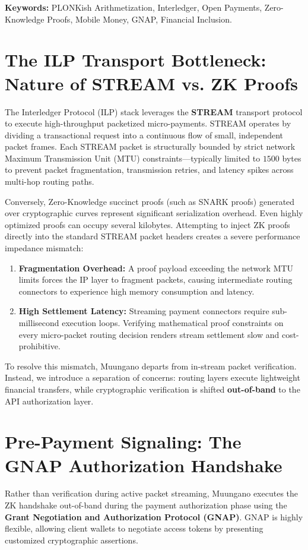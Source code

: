 \documentclass[12pt]{article}
\begin{document}
\textbf{Keywords:} PLONKish Arithmetization, Interledger, Open Payments, Zero-Knowledge Proofs, Mobile Money, GNAP, Financial Inclusion.

\newpage

\section{The ILP Transport Bottleneck: Nature of STREAM vs. ZK Proofs}
The Interledger Protocol (ILP) stack leverages the \textbf{STREAM} transport protocol to execute high-throughput packetized micro-payments. STREAM operates by dividing a transactional request into a continuous flow of small, independent packet frames. Each STREAM packet is structurally bounded by strict network Maximum Transmission Unit (MTU) constraints---typically limited to $1500$ bytes to prevent packet fragmentation, transmission retries, and latency spikes across multi-hop routing paths.

Conversely, Zero-Knowledge succinct proofs (such as SNARK proofs) generated over cryptographic curves represent significant serialization overhead. Even highly optimized proofs can occupy several kilobytes. Attempting to inject ZK proofs directly into the standard STREAM packet headers creates a severe performance impedance mismatch:
\begin{enumerate}
    \item \textbf{Fragmentation Overhead:} A proof payload exceeding the network MTU limits forces the IP layer to fragment packets, causing intermediate routing connectors to experience high memory consumption and latency.
    \item \textbf{High Settlement Latency:} Streaming payment connectors require sub-millisecond execution loops. Verifying mathematical proof constraints on every micro-packet routing decision renders stream settlement slow and cost-prohibitive.
\end{enumerate}

To resolve this mismatch, Muungano departs from in-stream packet verification. Instead, we introduce a separation of concerns: routing layers execute lightweight financial transfers, while cryptographic verification is shifted \textbf{out-of-band} to the API authorization layer.

\section{Pre-Payment Signaling: The GNAP Authorization Handshake}
Rather than verification during active packet streaming, Muungano executes the ZK handshake out-of-band during the payment authorization phase using the \textbf{Grant Negotiation and Authorization Protocol (GNAP)}. GNAP is highly flexible, allowing client wallets to negotiate access tokens by presenting customized cryptographic assertions. 
\end{document}
